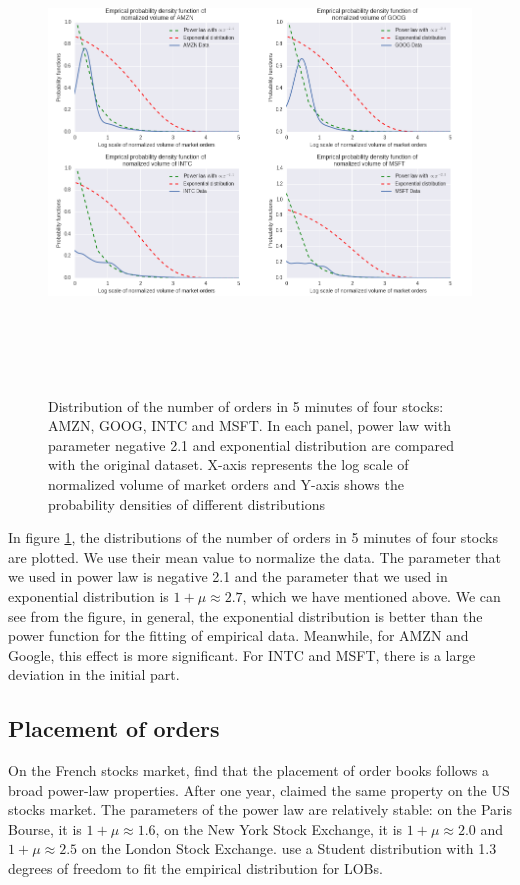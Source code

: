 \begin{figure}[hbtp]
	\begin{center}
		\includegraphics[width=6in, height=5in]{figures/volume.png}
	\end{center}
	\caption{Distribution of the number of orders in 5 minutes of four stocks:  AMZN, GOOG, INTC and MSFT. In each panel, power law with parameter negative 2.1 and exponential distribution  are compared with the original dataset. X-axis represents the log scale of normalized volume of market orders and Y-axis shows the probability densities of different distributions} \label{fig: volume}
\end{figure}

In figure \ref{fig: volume},  the distributions of the number of orders in 5 minutes of four stocks are plotted. We use their mean value to normalize the data. The parameter that we used in power law is negative 2.1 and the parameter that we used in exponential distribution is $1+\mu \approx 2.7$,  which we have mentioned above. We can see from the figure, in general,  the exponential distribution is better than the power function for the fitting of empirical data. Meanwhile, for AMZN and Google,  this effect is more significant.  For INTC and MSFT, there is a large deviation in the initial part.

\subsection{Placement of orders}
On the French stocks market,  \cite{bouchaud2002statistical} find that the placement of order books follows a broad power-law properties. After one year,  \cite{potters2003more} claimed the same property on the US stocks market. The parameters of the power law are relatively stable:  on the Paris Bourse,  it is $1+\mu \approx 1.6$,  on the New York Stock Exchange,  it is $1+\mu \approx 2.0$ and $1+\mu \approx 2.5$ on the London Stock Exchange. \cite{mike2008empirical} use a Student distribution with 1.3 degrees of freedom to fit the empirical distribution for LOBs. 

